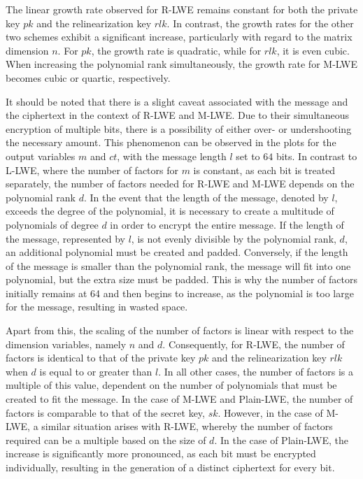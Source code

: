 The linear growth rate observed for R-LWE remains constant for both the private key $pk$ and the relinearization key $rlk$. In contrast, the growth rates for the other two schemes exhibit a significant increase, particularly with regard to the matrix dimension $n$. For $pk$, the growth rate is quadratic, while for $rlk$, it is even cubic. When increasing the polynomial rank simultaneously, the growth rate for M-LWE becomes cubic or quartic, respectively.

It should be noted that there is a slight caveat associated with the message and the ciphertext in the context of R-LWE and M-LWE. Due to their simultaneous encryption of multiple bits, there is a possibility of either over- or undershooting the necessary amount. This phenomenon can be observed in the plots for the output variables $m$ and $ct$, with the message length $l$ set to $64$ bits. In contrast to L-LWE, where the number of factors for $m$ is constant, as each bit is treated separately, the number of factors needed for R-LWE and M-LWE depends on the polynomial rank $d$. In the event that the length of the message, denoted by $l$, exceeds the degree of the polynomial, it is necessary to create a multitude of polynomials of degree $d$ in order to encrypt the entire message. If the length of the message, represented by $l$, is not evenly divisible by the polynomial rank, $d$, an additional polynomial must be created and padded. Conversely, if the length of the message is smaller than the polynomial rank, the message will fit into one polynomial, but the extra size must be padded. This is why the number of factors initially remains at 64 and then begins to increase, as the polynomial is too large for the message, resulting in wasted space.

Apart from this, the scaling of the number of factors is linear with respect to the dimension variables, namely $n$ and $d$. Consequently, for R-LWE, the number of factors is identical to that of the private key $pk$ and the relinearization key $rlk$ when $d$ is equal to or greater than $l$. In all other cases, the number of factors is a multiple of this value, dependent on the number of polynomials that must be created to fit the message. In the case of M-LWE and Plain-LWE, the number of factors is comparable to that of the secret key, $sk$. However, in the case of M-LWE, a similar situation arises with R-LWE, whereby the number of factors required can be a multiple based on the size of $d$. In the case of Plain-LWE, the increase is significantly more pronounced, as each bit must be encrypted individually, resulting in the generation of a distinct ciphertext for every bit.

